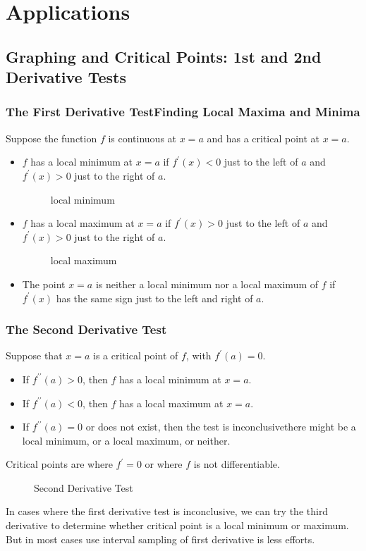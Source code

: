 \chapter{Applications}
\section{Graphing and Critical Points: 1st and 2nd Derivative Tests}
\subsection{The First Derivative Test\textemdash Finding Local Maxima and Minima}
Suppose the function $f$ is continuous at $x=a$ and has a critical point at $x=a$.
\begin{itemize}
\item $f$ has a local minimum at $x=a$ if $f^\prime(x)<0$ just to the left of $a$ and $f^\prime(x)>0$ just to the right of $a$.
  \begin{figure}[H]
    \centering
    \caption{local minimum}
  \end{figure}
\item $f$ has a local maximum at $x=a$ if $f^\prime (x)>0$ just to the left of $a$ and $f^\prime (x)>0$ just to the right of $a$.
  \begin{figure}[H]
    \centering
    \caption{local maximum}
  \end{figure}
\item The point $x=a$ is neither a local minimum nor a local maximum of $f$ if $f^\prime (x)$ has the same sign just to the left and right of $a$.
\end{itemize}

\subsection{The Second Derivative Test}
Suppose that $x=a$ is a critical point of $f$, with $f^\prime(a)=0$.
\begin{itemize}
\item If $f^{\prime\prime}(a)>0$, then $f$ has a local minimum at $x=a$.
\item If $f^{\prime\prime}(a)<0$, then $f$ has a local maximum at $x=a$.
\item If $f^{\prime\prime}(a)=0$ or does not exist, then the test is inconclusive\textemdash there might be a local minimum, or a local maximum, or neither.
\end{itemize}
\begin{definition}
Critical points are where $f^\prime=0$ or where $f$ is not differentiable.
\end{definition}
\begin{figure}[H]
  \centering
  \caption{Second Derivative Test}
\end{figure}
\begin{note}
  In cases where the first derivative test is inconclusive, we can try the third derivative to determine whether critical point is a local minimum or maximum. But in most cases use interval sampling of first derivative is less efforts.
\end{note}

